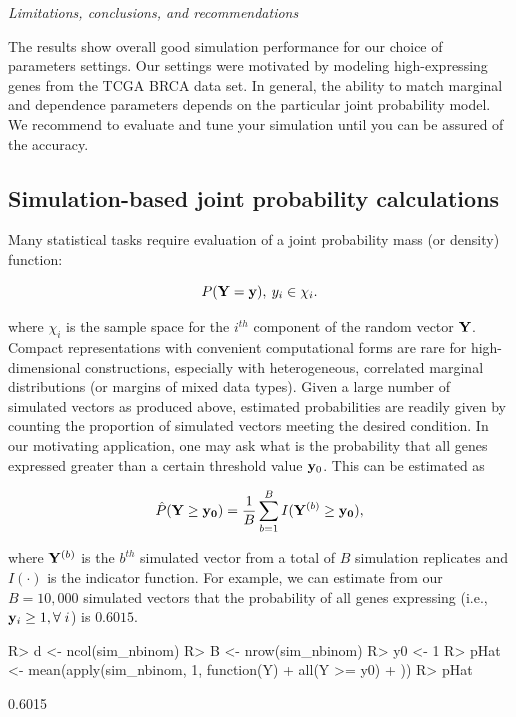 \documentclass[
]{jss}
\begin{document}
\emph{Limitations, conclusions, and recommendations}

The results show overall good simulation performance for our choice of
parameters settings. Our settings were motivated by modeling
high-expressing genes from the TCGA BRCA data set. In general, the
ability to match marginal and dependence parameters depends on the
particular joint probability model. We recommend to evaluate and tune
your simulation until you can be assured of the accuracy.

\hypertarget{simulation-based-joint-probability-calculations}{%
\subsection{Simulation-based joint probability
calculations}\label{simulation-based-joint-probability-calculations}}

Many statistical tasks require evaluation of a joint probability mass
(or density) function:

\[
P( {\bf Y} = {\bf y} ), \: y_i \in \chi_i.
\]

where \(\chi_i\) is the sample space for the \(i^{th}\) component of the
random vector \(\bf{Y}\). Compact representations with convenient
computational forms are rare for high-dimensional constructions,
especially with heterogeneous, correlated marginal distributions (or
margins of mixed data types). Given a large number of simulated vectors
as produced above, estimated probabilities are readily given by counting
the proportion of simulated vectors meeting the desired condition. In
our motivating application, one may ask what is the probability that all
genes expressed greater than a certain threshold value \({\bf y}_0\).
This can be estimated as

\[
\hat{P}( {\bf Y} \ge {\bf y_0 } ) = \frac{1}{B} \sum_{b=1}^B I( {\bf Y}^{ (b) } \ge {\bf y_0} ),
\]

where \({\bf Y}^{(b)}\) is the \(b^{th}\) simulated vector from a total
of \(B\) simulation replicates and \(I(\cdot)\) is the indicator
function. For example, we can estimate from our \(B=10,000\) simulated
vectors that the probability of all genes expressing (i.e.,
\({\bf y}_i \geq 1, \forall \; i\)) is \(0.6015\).

\begin{CodeChunk}
\begin{CodeInput}
R> d <- ncol(sim_nbinom)
R> B <- nrow(sim_nbinom)
R> y0 <- 1
R> pHat <- mean(apply(sim_nbinom, 1, function(Y) {
+   all(Y >= y0)
+ }))
R> pHat
\end{CodeInput}
\begin{CodeOutput}
[1] 0.6015
\end{CodeOutput}
\end{CodeChunk}
\end{document}
